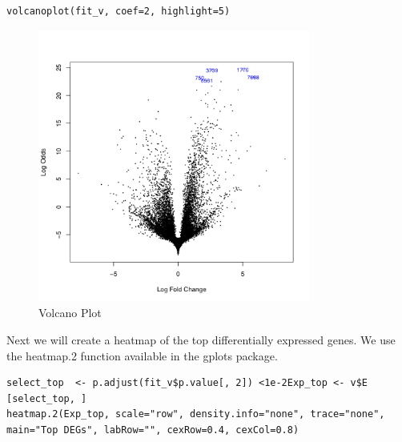\begin{steps}
\begin{steps}
\begin{lstlisting}
volcanoplot(fit_v, coef=2, highlight=5)
\end{lstlisting}
\end{steps}

\begin{figure}[H]
\centering
\includegraphics[width=0.8\textwidth]{handout/Volcano.png}
\caption{Volcano Plot}
\label{fig:Volcano plot}
\end{figure}


Next we will create a heatmap of the top differentially expressed genes. We use the heatmap.2 function available in the gplots package.
\begin{steps}
\begin{lstlisting}
select_top  <- p.adjust(fit_v$p.value[, 2]) <1e-2Exp_top <- v$E [select_top, ]
heatmap.2(Exp_top, scale="row", density.info="none", trace="none", main="Top DEGs", labRow="", cexRow=0.4, cexCol=0.8)
\end{lstlisting}
\end{steps}


\end{steps}
